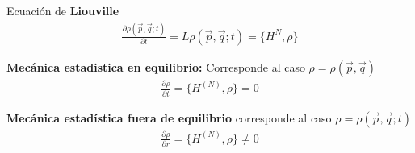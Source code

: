 \documentclass{article}
\begin{document}
\hfill 

\hfill 

Ecuación de \textbf{Liouville }
\begin{gather*}
  \frac{\partial \rho(\vec p, \vec q ; t ) }{\partial t } = L \rho(\vec p , \vec q ; t ) = \{H ^ {N }, \rho\}
\end{gather*}

\hfill 

\hfill 

\textbf{Mecánica estadistica en equilibrio: }Corresponde al caso $ \rho = \rho(\vec p, \vec q ) $
\begin{gather*}
  \frac{\partial \rho }{\partial t } = \{H ^ {(N) }, \rho\} = 0
\end{gather*}

\textbf{Mecánica estadística fuera de equilibrio } corresponde al caso $ \rho = \rho(\vec p, \vec q ; t ) $
\begin{gather*}
  \frac{\partial \rho }{\partial r } = \{H ^ {(N) }, \rho\} \neq 0 
\end{gather*}
\end{document}
